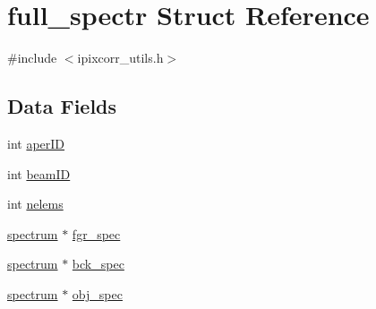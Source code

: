 \hypertarget{structfull__spectr}{
\section{full\_\-spectr Struct Reference}
\label{structfull__spectr}
}


{\ttfamily \#include $<$ipixcorr\_\-utils.h$>$}\subsection*{Data Fields}
\begin{DoxyCompactItemize}
\item 
int \hyperlink{structfull__spectr_a23d627eb19c4c148165339f09baae88b}{aperID}
\item 
int \hyperlink{structfull__spectr_abbbe908129fb930d91fa025be6ed63d0}{beamID}
\item 
int \hyperlink{structfull__spectr_a8f580565ed9f3fe21c4961c75ed0db7e}{nelems}
\item 
\hyperlink{structspectrum}{spectrum} $\ast$ \hyperlink{structfull__spectr_a82b0b0c21545b0af2fd869ec00227be5}{fgr\_\-spec}
\item 
\hyperlink{structspectrum}{spectrum} $\ast$ \hyperlink{structfull__spectr_a6ec36890c31b664af3b77e4a98f40d53}{bck\_\-spec}
\item 
\hyperlink{structspectrum}{spectrum} $\ast$ \hyperlink{structfull__spectr_ab003d5523b6cf8d7114cb638685c64e7}{obj\_\-spec}
\end{DoxyCompactItemize}


